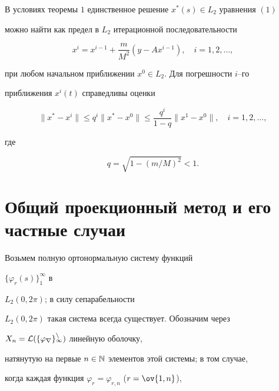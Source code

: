 \begin{thm}


В условиях теоремы $1$ единственное решение $x^*(s)\in L_2$ уравнения $(1)$


можно найти как предел в $L_2$ итерационной последовательности


\begin{equation}


x^i=x^{i-1}+\frac{m}{M^2}( y-Ax^{i-1}),\quad


i=1,2,\dotsc,


\end{equation}


при любом начальном приближении $x^0\in L_2$. Для погрешности $i$--го


приближения $x^i(t)$ справедливы оценки


\begin{equation}


\|x^*-x^i\|\leq q^i\|x^*-x^0\|\leq \frac{q^i}{1-q}\|x^1-x^0\|,


\quad i=1,2,\dotsc,


\end{equation}


где


\begin{equation}


q=\sqrt{1-(m/M)^2}<1.


\end{equation}


\end{thm}





\section{Общий проекционный метод и его частные случаи}





Возьмем полную ортонормальную систему функций


$\{ \varphi_r(s)\}_1^\infty$ в


$L_2(0,2\pi)$; в силу сепарабельности


$L_2(0,2\pi)$ такая система всегда существует. Обозначим через


$X_n=\cal L(\{\varphi_r\}_1^n)$ линейную оболочку,


натянутую на первые $n\in \Bbb N$ элементов этой системы; в том случае,


когда каждая функция $\varphi_r=\varphi_{r,n}$ ($r=\ov{1,n}$),


